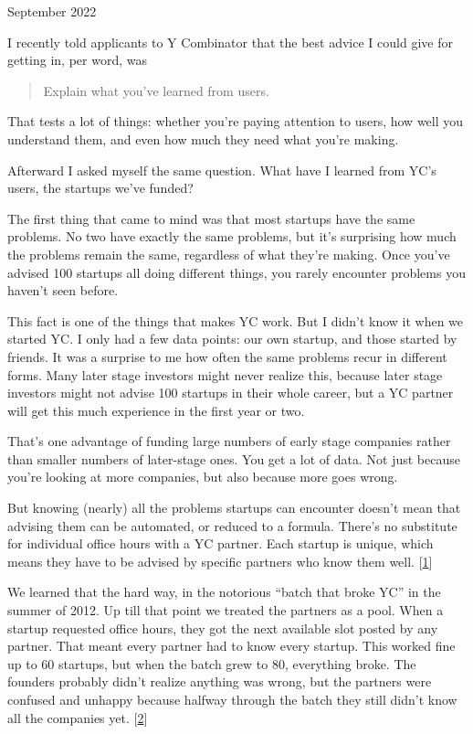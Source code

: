 September 2022

I recently told applicants to Y Combinator that the best advice I could
give for getting in, per word, was

\begin{quote}
Explain what you've learned from users.
\end{quote}

That tests a lot of things: whether you're paying attention to users,
how well you understand them, and even how much they need what you're
making.

Afterward I asked myself the same question. What have I learned from
YC's users, the startups we've funded?

The first thing that came to mind was that most startups have the same
problems. No two have exactly the same problems, but it's surprising how
much the problems remain the same, regardless of what they're making.
Once you've advised 100 startups all doing different things, you rarely
encounter problems you haven't seen before.

This fact is one of the things that makes YC work. But I didn't know it
when we started YC. I only had a few data points: our own startup, and
those started by friends. It was a surprise to me how often the same
problems recur in different forms. Many later stage investors might
never realize this, because later stage investors might not advise 100
startups in their whole career, but a YC partner will get this much
experience in the first year or two.

That's one advantage of funding large numbers of early stage companies
rather than smaller numbers of later-stage ones. You get a lot of data.
Not just because you're looking at more companies, but also because more
goes wrong.

But knowing (nearly) all the problems startups can encounter doesn't
mean that advising them can be automated, or reduced to a formula.
There's no substitute for individual office hours with a YC partner.
Each startup is unique, which means they have to be advised by specific
partners who know them well. {[}\hyperref[f1n]{1}{]}

We learned that the hard way, in the notorious ``batch that broke YC''
in the summer of 2012. Up till that point we treated the partners as a
pool. When a startup requested office hours, they got the next available
slot posted by any partner. That meant every partner had to know every
startup. This worked fine up to 60 startups, but when the batch grew to
80, everything broke. The founders probably didn't realize anything was
wrong, but the partners were confused and unhappy because halfway
through the batch they still didn't know all the companies yet.
{[}\hyperref[f2n]{2}{]}

